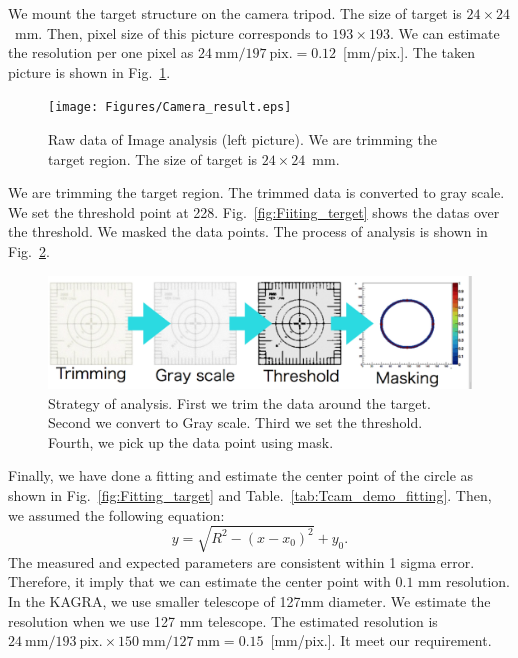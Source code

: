 We mount the target structure on the camera tripod. The size of target is $24 \times 24$~mm. Then, pixel size of this picture corresponds to $193 \times 193$. We can estimate the resolution per one pixel as $24~\mathrm{mm}/197~\mathrm{pix.}=0.12$~[mm/pix.]. The taken picture is shown in Fig.~\ref{fig:Camera_result}.
   \begin{figure}
\begin{center}
\texttt{[image: Figures/Camera\_result.eps]}
\caption{Raw data of Image analysis (left picture). We are trimming the target region. The size of target is $24 \times 24$~mm.} 
\label{fig:Camera_result} 
\end{center}
\end{figure}

We are trimming the target region. The trimmed data is converted to gray scale. We set the threshold point at 228.
Fig.~\ref{fig:Fiiting_terget} shows the datas over the threshold.
We masked the data points.
The process of analysis is shown in Fig.~\ref{fig:Analysis_cam}.

   \begin{figure}
\begin{center}
\includegraphics[width=14cm]{Figures/Analysis_cam.eps}
\caption{Strategy of analysis. First we trim the data around the target. Second we convert to Gray scale. Third we set the threshold. Fourth, we pick up the data point using mask. } 
\label{fig:Analysis_cam} 
\end{center}
\end{figure}

Finally, we have done a fitting and estimate the center point of the circle as shown in Fig.~\ref{fig:Fitting_target} and Table.~\ref{tab:Tcam_demo_fitting}.
Then, we assumed the following equation:
\begin{equation}
y=\sqrt{R^2-(x-x_0)^2}+y_0.
\end{equation} 
The measured and expected parameters are consistent within 1 sigma error.
Therefore, it imply that we can estimate the center point with $0.1$ mm resolution.
In the KAGRA, we use smaller telescope of 127mm diameter.
We estimate the resolution when we use 127 mm telescope.
The estimated resolution is $24~\mathrm{mm}/193~\mathrm{pix.}\times 150~\mathrm{mm}/127~\mathrm{mm}=0.15$~[mm/pix.]. It meet our requirement.

